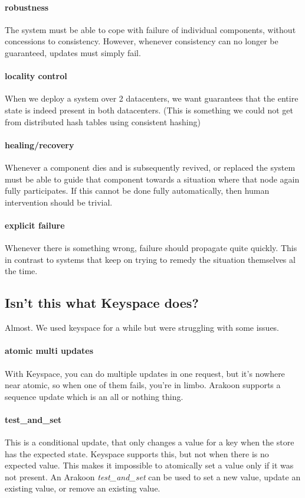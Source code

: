 \paragraph{robustness}
The system must be able to cope with failure of individual components, without concessions to consistency.
However, whenever consistency can no longer be guaranteed, updates must simply fail.
\paragraph{locality control}
When we deploy a system over 2 datacenters, we want guarantees that the entire state is indeed present in both datacenters. (This is something we could not get from distributed hash tables using consistent hashing)

\paragraph{healing/recovery}
Whenever a component dies and is subsequently revived, or replaced the system must be able to guide that component towards a situation where that node again fully participates. 
If this cannot be done fully automatically, then human intervention should be trivial.
\paragraph{explicit failure}
Whenever there is something wrong, failure should propagate quite quickly.
This in contrast to systems that keep on trying to remedy the situation themselves al the time.
\subsection{Isn't this what Keyspace does?}
Almost. We used keyspace for a while but were struggling with some issues.

\paragraph{atomic multi updates}
With Keyspace, you can do multiple updates in one request, 
but it's nowhere near atomic, so when one of them fails, you're in limbo. Arakoon supports a sequence update which is an all or nothing thing.
\paragraph{test\_and\_set}
This is a conditional update, that only changes a value for a key when the store has the expected state.
Keyspace supports this, but not when there is no expected value. 
This makes it impossible to atomically set a value only if it was not present.
An Arakoon \emph{test\_and\_set} can be used to set a new value, 
update an existing value, or remove an existing value.
